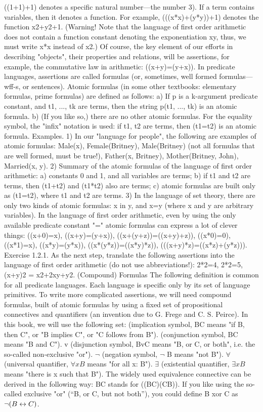 ((1+1)+1) denotes a specific natural number---the number 3). If a term contains variables, then it denotes
a function. For example, (((x*x)+(y*y))+1) denotes the function x2+y2+1. (Warning! Note that the
language of first order arithmetic does not contain a function constant denoting the exponentiation xy,
thus, we must write x*x instead of x2.)
Of course, the key element of our efforts in describing "objects", their properties and relations, will be
assertions, for example, the commutative law in arithmetic: ((x+y)=(y+x)). In predicate languages,
assertions are called formulas (or, sometimes, well formed formulas---wff-s, or sentences).
Atomic formulas (in some other textbooks: elementary formulas, prime formulas) are defined as follows:
a) If p is a k-argument predicate constant, and t1, ..., tk are terms, then the string p(t1, ..., tk) is an atomic
formula.
b) (If you like so,) there are no other atomic formulas.
For the equality symbol, the "infix" notation is used: if t1, t2 are terms, then (t1=t2) is an atomic formula.
Examples. 1) In our "language for people", the following are examples of atomic formulas: Male(x), Female(Britney),
Male(Britney) (not all formulas that are well formed, must be true!), Father(x, Britney), Mother(Britney, John), Married(x, y).
2) Summary of the atomic formulas of the language of first order arithmetic: a) constants 0 and 1, and all variables are terms;
b) if t1 and t2 are terms, then (t1+t2) and (t1*t2) also are terms; c) atomic formulas are built only as (t1=t2), where t1 and t2 are
terms.
3) In the language of set theory, there are only two kinds of atomic formulas: x in y, and x=y (where x and y are arbitrary
variables).
In the language of first order arithmetic, even by using the only available predicate constant "=" atomic
formulas can express a lot of clever things:
((x+0)=x), ((x+y)=(y+x)), ((x+(y+z))=((x+y)+z)),
((x*0)=0), ((x*1)=x), ((x*y)=(y*x)), ((x*(y*z))=((x*y)*z)),
(((x+y)*z)=((x*z)+(y*z))).
Exercise 1.2.1. As the next step, translate the following assertions into the language of first order
arithmetic (do not use abbreviations!): 2*2=4, 2*2=5, (x+y)2 = x2+2xy+y2.
(Compound) Formulas
The following definition is common for all predicate languages. Each language is specific only by its
set of language primitives.
To write more complicated assertions, we will need compound formulas, built of atomic formulas by
using a fixed set of propositional connectives and quantifiers (an invention due to G. Frege and C. S.
Peirce). In this book, we will use the following set:
\IMPLIES  (implication symbol, B\IMPLIES C means "if B, then C", or "B implies C", or "C follows from B").
\AND  (conjunction symbol, B\AND C means "B and C").
v (disjunction symbol, BvC means "B, or C, or both", i.e. the so-called non-exclusive "or").
\(\neg\)  (negation symbol, \(\neg\) B means "not B").
\(\forall\)  (universal quantifier, \(\forall xB\) means "for all x: B").
\(\exists\)  (existential quantifier, \(\exists xB\) means "there is x such that B").
The widely used equivalence connective \IFF  can be derived in the following way: B\IFF C stands for
((B\IMPLIES C)\AND (C\IMPLIES B)). If you like using the so-called exclusive "or" (``B, or C, but not both''), you could
define B xor C as \(\neg (B\leftrightarrow C)\).

